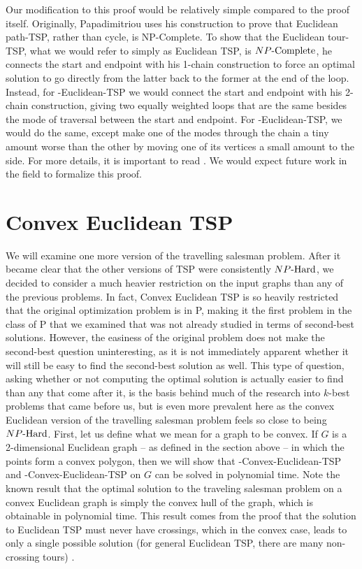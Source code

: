Our modification to this proof would be relatively simple compared to the proof itself. Originally, Papadimitriou uses his construction to prove that Euclidean path-TSP, rather than cycle, is NP-Complete. To show that the Euclidean tour-TSP, what we would refer to simply as Euclidean TSP, is ${NP\text{-Complete}}{}$, he connects the start and endpoint with his 1-chain construction to force an optimal solution to go directly from the latter back to the former at the end of the loop. Instead, for \inob{}-Euclidean-TSP we would connect the start and endpoint with his 2-chain construction, giving two equally weighted loops that are the same besides the mode of traversal between the start and endpoint. For \exob{}-Euclidean-TSP, we would do the same, except make one of the modes through the chain a tiny amount worse than the other by moving one of its vertices a small amount to the side. For more details, it is important to read \cite{papadimitriou1977euclidean}. We would expect future work in the field to formalize this proof.


\section{Convex Euclidean TSP}
We will examine one more version of the travelling salesman problem. After it became clear that the other versions of TSP were consistently ${NP\text{-Hard{}}}$, we decided to consider a much heavier restriction on the input graphs than any of the previous problems. In fact, Convex Euclidean TSP is so heavily restricted that the original optimization problem is in P, making it the first problem in the class of P that we examined that was not already studied in terms of second-best solutions. However, the easiness of the original problem does not make the second-best question uninteresting, as it is not immediately apparent whether it will still be easy to find the second-best solution as well. This type of question, asking whether or not computing the optimal solution is actually easier to find than any that come after it, is the basis behind much of the research into $k$-best problems that came before us, but is even more prevalent here as the convex Euclidean version of the travelling salesman problem feels so close to being ${NP\text{-Hard{}}}$. First, let us define what we mean for a graph to be convex. If $G$ is a 2-dimensional Euclidean graph -- as defined in the section above -- in which the points form a convex polygon, then we will show that \exob{}-Convex-Euclidean-TSP and \inob{}-Convex-Euclidean-TSP on $G$ can be solved in polynomial time.  Note the known result that the optimal solution to the traveling salesman problem on a convex Euclidean graph is simply the convex hull of the graph, which is obtainable in polynomial time. This result comes from the proof that the solution to Euclidean TSP must never have crossings, which in the convex case, leads to only a single possible solution (for general Euclidean TSP, there are many non-crossing tours) \cite{quintas1965on, arora1998polynomial}.

